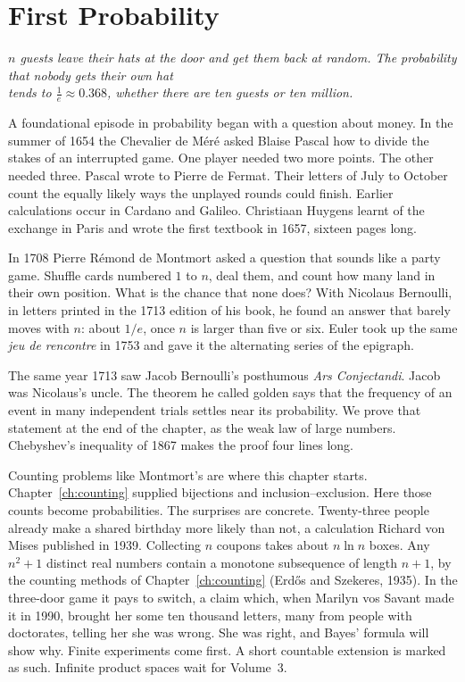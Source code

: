 \chapter{First Probability}\label{ch:probability}

\begin{center}\itshape
$n$ guests leave their hats at the door and get them back at random. The probability that nobody gets their own hat\\
tends to $\frac1e\approx0.368$, whether there are ten guests or ten million.
\end{center}

A foundational episode in probability began with a question about money. In the summer of 1654 the Chevalier de M\'er\'e asked Blaise Pascal how to divide the stakes of an interrupted game. One player needed two more points. The other needed three. Pascal wrote to Pierre de Fermat. Their letters of July to October count the equally likely ways the unplayed rounds could finish. Earlier calculations occur in Cardano and Galileo. Christiaan Huygens learnt of the exchange in Paris and wrote the first textbook in 1657, sixteen pages long.

In 1708 Pierre R\'emond de Montmort asked a question that sounds like a party game. Shuffle cards numbered $1$ to $n$, deal them, and count how many land in their own position. What is the chance that none does? With Nicolaus Bernoulli, in letters printed in the 1713 edition of his book, he found an answer that barely moves with $n$: about $1/e$, once $n$ is larger than five or six. Euler took up the same \emph{jeu de rencontre} in 1753 and gave it the alternating series of the epigraph.

The same year 1713 saw Jacob Bernoulli's posthumous \emph{Ars Conjectandi}. Jacob was Nicolaus's uncle. The theorem he called golden says that the frequency of an event in many independent trials settles near its probability. We prove that statement at the end of the chapter, as the weak law of large numbers. Chebyshev's inequality of 1867 makes the proof four lines long.

Counting problems like Montmort's are where this chapter starts. Chapter~\ref{ch:counting} supplied bijections and inclusion--exclusion. Here those counts become probabilities. The surprises are concrete. Twenty-three people already make a shared birthday more likely than not, a calculation Richard von Mises published in 1939. Collecting $n$ coupons takes about $n\ln n$ boxes. Any $n^2+1$ distinct real numbers contain a monotone subsequence of length $n+1$, by the counting methods of Chapter~\ref{ch:counting} (Erd\H os and Szekeres, 1935). In the three-door game it pays to switch, a claim which, when Marilyn vos Savant made it in 1990, brought her some ten thousand letters, many from people with doctorates, telling her she was wrong. She was right, and Bayes' formula will show why. Finite experiments come first. A short countable extension is marked as such. Infinite product spaces wait for Volume~3.

